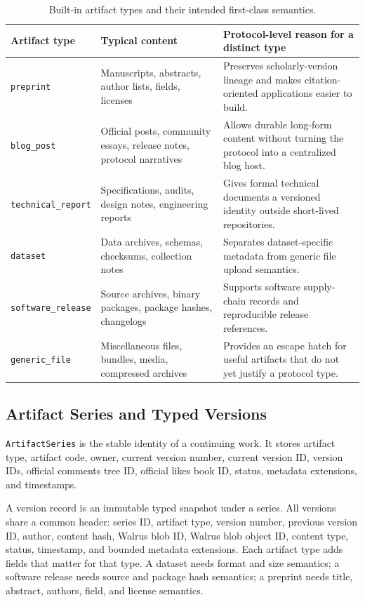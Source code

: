 \documentclass[journal]{IEEEtran}
\newcommand{\artifact}{\texttt{ArtifactSeries}}
\begin{document}
\begin{table}[!t]
\centering
\caption{Built-in artifact types and their intended first-class semantics.}
\label{tab:artifact_types}
\begin{tabularx}{\textwidth}{>{\raggedright\arraybackslash}p{3cm}>{\raggedright\arraybackslash}p{4.4cm}>{\raggedright\arraybackslash}X}
\toprule
Artifact type & Typical content & Protocol-level reason for a distinct type \\
\midrule
\texttt{preprint} & Manuscripts, abstracts, author lists, fields, licenses & Preserves scholarly-version lineage and makes citation-oriented applications easier to build. \\
\texttt{blog\_post} & Official posts, community essays, release notes, protocol narratives & Allows durable long-form content without turning the protocol into a centralized blog host. \\
\texttt{technical\_report} & Specifications, audits, design notes, engineering reports & Gives formal technical documents a versioned identity outside short-lived repositories. \\
\texttt{dataset} & Data archives, schemas, checksums, collection notes & Separates dataset-specific metadata from generic file upload semantics. \\
\texttt{software\_release} & Source archives, binary packages, package hashes, changelogs & Supports software supply-chain records and reproducible release references. \\
\texttt{generic\_file} & Miscellaneous files, bundles, media, compressed archives & Provides an escape hatch for useful artifacts that do not yet justify a protocol type. \\
\bottomrule
\end{tabularx}
\end{table}

\subsection{Artifact Series and Typed Versions}

\artifact{} is the stable identity of a continuing work. It stores artifact type, artifact code, owner, current version number, current version ID, version IDs, official comments tree ID, official likes book ID, status, metadata extensions, and timestamps.

A version record is an immutable typed snapshot under a series. All versions share a common header: series ID, artifact type, version number, previous version ID, author, content hash, Walrus blob ID, Walrus blob object ID, content type, status, timestamp, and bounded metadata extensions. Each artifact type adds fields that matter for that type. A dataset needs format and size semantics; a software release needs source and package hash semantics; a preprint needs title, abstract, authors, field, and license semantics.
\end{document}
